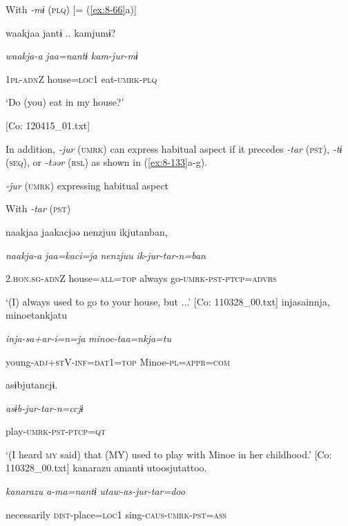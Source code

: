 \ex With \textit{{}-mɨ} (\textsc{plq}) [= (\ref{ex:8-66}a)]

  {\TM}
\glll  waakjaa  jantɨ ..  kamjumɨ?

    \textit{waakja-a}  \textit{jaa=nantɨ}  \textit{kam-jur-mɨ}

    1\textsc{pl}-\textsc{adn}Z  house=\textsc{loc}1  eat-\textsc{umrk}-\textsc{plq}

    ‘Do (you) eat in my house?’

    [Co: 120415\_01.txt]
\z

  In addition, \textit{{}-jur} (\textsc{umrk}) can express habitual aspect if it precedes \textit{{}-tar} (\textsc{pst}), \textit{{}-tɨ} (\textsc{seq}), or \textit{{}-təər} (\textsc{rsl}) as shown in (\ref{ex:8-133}a-g).

\ea\label{ex:8-133}
  \textit{{}-jur} (\textsc{umrk}) expressing habitual aspect

  With \textit{{}-tar} (\textsc{pst})

\ea {\TM}
\glll  naakjaa  jaakacjəə  {\textbar}nenzjuu{\textbar}  ikjutanban,

      \textit{naakja-a}  \textit{jaa=kaci=ja}  \textit{nenzjuu}  \textit{ik-jur-tar{}-n=ban}

      2.\textsc{hon}.\textsc{sg}-\textsc{adn}Z  house=\textsc{all}=\textsc{top}  always  go-\textsc{umrk}-\textsc{pst}-\textsc{ptcp}=\textsc{advrs}

\glt ‘(I) always used to go to your house, but ...’ [Co: 110328\_00.txt]
\ex {\TM}
\glll  injasainnja,  minoetankjatu

      \textit{inja-sa+ar-i=n=ja}  \textit{minoe-taa=nkja=tu}

      young-\textsc{adj}+\textsc{st}V-\textsc{inf}=\textsc{dat}1=\textsc{top}  Minoe-\textsc{pl}=\textsc{appr}=\textsc{com}

      asɨbjutancjɨ.

      \textit{asɨb-jur-tar{}-n=ccjɨ}

      play-\textsc{umrk}-\textsc{pst}-\textsc{ptcp}=\textsc{qt}

\glt ‘(I heard \textsc{my} said) that (MY) used to play with Minoe in her childhood.’ [Co: 110328\_00.txt]
\ex {\TM}
\glll  {\textbar}kanarazu{\textbar}  amantɨ  utoosjutattoo.

      \textit{kanarazu}  \textit{a-ma=nantɨ}  \textit{utaw-as-jur-tar=doo}

      necessarily  \textsc{dist}-place=\textsc{loc}1  sing-\textsc{caus}-\textsc{umrk}-\textsc{pst}=\textsc{ass}

